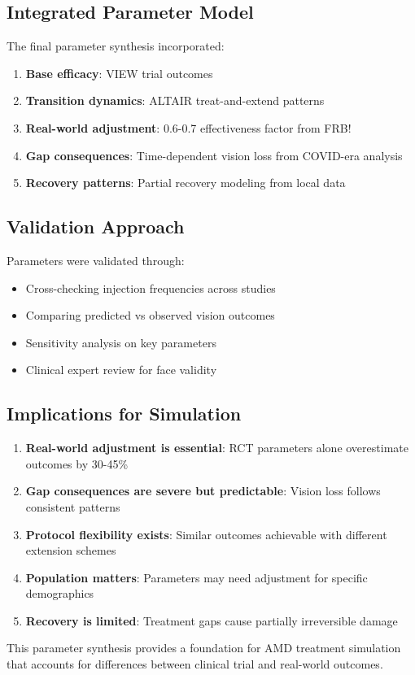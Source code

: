 \subsection{Integrated Parameter Model}

The final parameter synthesis incorporated:

\begin{enumerate}
    \item \textbf{Base efficacy}: VIEW trial outcomes
    \item \textbf{Transition dynamics}: ALTAIR treat-and-extend patterns
    \item \textbf{Real-world adjustment}: 0.6-0.7 effectiveness factor from FRB!
    \item \textbf{Gap consequences}: Time-dependent vision loss from COVID-era analysis
    \item \textbf{Recovery patterns}: Partial recovery modeling from local data
\end{enumerate}

\subsection{Validation Approach}

Parameters were validated through:

\begin{itemize}
    \item Cross-checking injection frequencies across studies
    \item Comparing predicted vs observed vision outcomes
    \item Sensitivity analysis on key parameters
    \item Clinical expert review for face validity
\end{itemize}

\subsection{Implications for Simulation}

\begin{enumerate}
    \item \textbf{Real-world adjustment is essential}: RCT parameters alone overestimate outcomes by 30-45\%
    \item \textbf{Gap consequences are severe but predictable}: Vision loss follows consistent patterns
    \item \textbf{Protocol flexibility exists}: Similar outcomes achievable with different extension schemes
    \item \textbf{Population matters}: Parameters may need adjustment for specific demographics
    \item \textbf{Recovery is limited}: Treatment gaps cause partially irreversible damage
\end{enumerate}

This parameter synthesis provides a foundation for AMD treatment simulation that accounts for differences between clinical trial and real-world outcomes.